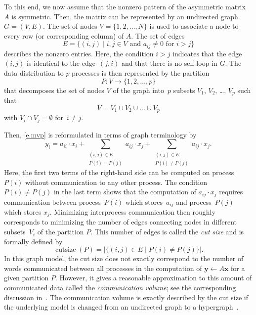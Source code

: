 \documentclass[12pt, twoside,a4paper,toc=bibliography]{scrbook}
\newcommand{\mat}[1]{\ensuremath{#1}}
\newcommand{\vek}[1]{{\ensuremath{\mathbf #1}}}
\begin{document}
To this end, we now assume that the nonzero pattern of the asymmetric matrix \mat{A} is
symmetric. Then, the matrix can be represented by an undirected graph $G=(V,E)$. The set
of nodes $V = \{ 1, 2, \dots, N\}$ is used to associate a node to every row (or
corresponding column) of \mat{A}. The set of edges
\begin{displaymath}
E = \{ (i,j) \mid i, j \in V \text{ and } a_{ij} \neq 0 \text{ for } i > j \}
\end{displaymath}
describes the nonzero entries. Here, the condition $i>j$ indicates that the edge~$(i,j)$
is identical to the edge~$(j,i)$ and that there is no self-loop in $G$. The data
distribution to $p$ processes is then represented by the partition
$$
P: V \rightarrow \{1, 2, \dots, p\}
$$
that decomposes the set of nodes $V$ of the graph into~$p$ subsets $V_1$, $V_2$, \dots,
$V_p$ such that
$$
V = V_1 \cup V_2 \cup \dots \cup V_p
$$
with $V_i \cap V_j = \emptyset$ for~$i \neq j$.


Then, \eqref{e.mvp} is reformulated in terms of graph terminology by
\begin{displaymath}
y_i = a_{ii} \cdot x_i +
\sum_{ \substack{(i,j)\in E \\ P(i)=P(j)}} a_{ij} \cdot x_j
+ \sum_{ \substack{(i,j)\in E \\ P(i)\neq P(j)}} a_{ij} \cdot x_j .
\end{displaymath}
Here, the first two terms of the right-hand side can be computed on process~$P(i)$
without communication to any other process. The condition~$P(i)\neq P(j)$ in the last
term shows that the computation of $a_{ij} \cdot x_j$ requires communication between
process~$P(i)$ which stores~$a_{ij}$ and process~$P(j)$ which stores $x_j$. Minimizing
interprocess communication then roughly corresponds to minimizing the number of edges
connecting nodes in different subsets~$V_i$ of the partition $P$. This number of edges is
called the \emph{cut size} and is formally defined by
\begin{equation}\label{e.cut}
\operatorname{cutsize}(P) = \bigl| \{ (i,j) \in E \mid P(i)\neq P(j) \} \bigr|.
\end{equation}
In this graph model, the cut size does not exactly correspond to the number of words
communicated between all processes in the computation of $\vek{y} \leftarrow \mat{A}
\vek{x}$ for a given partition $P$. However, it gives a reasonable approximation to this
amount of communicated data called the \emph{communication volume}; see the corresponding
discussion in~\cite{hk:mod}. The communication volume is exactly described by the cut
size if the underlying model is changed from an undirected graph to a
hypergraph~\cite{ca:hyp,cua:hyp,ua:rev}.
\end{document}
